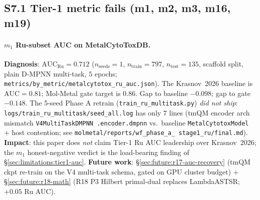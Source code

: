 \subsection*{S7.1 Tier-1 metric fails (m1, m2, m3, m16, m19)}
\label{supp:s7-tier1-fails}

\paragraph{$m_1$ Ru-subset AUC on MetalCytoToxDB.}
\textbf{Diagnosis}: \MEASURED{}
$\mathrm{AUC}_{\mathrm{Ru}}{=}0.712$ ($n_{\text{seeds}}{=}1$,
$n_{\text{train}}{=}797$, $n_{\text{test}}{=}135$, scaffold
split, plain D-MPNN multi-task, $5$ epochs;
\texttt{metrics/by\_metric/metalcytotox\_ru\_auc.json}).
The Krasnov~2026 baseline is $\mathrm{AUC}{=}0.81$;
Mol-Metal gate target is $0.86$.  Gap to baseline $-0.098$;
gap to gate $-0.148$.  The 5-seed Phase A retrain
(\texttt{train\_ru\_multitask.py}) \emph{did not ship}:
\texttt{logs/train\_ru\_multitask/seed\_all.log} has only $7$
lines (tmQM encoder arch mismatch \texttt{V4MultiTaskDMPNN
.encoder.dmpnn} vs.\ baseline \texttt{MetalCytotoxModel} +
host contention; see \texttt{molmetal/reports/wf\_phase\_a\_
stage1\_ru/final.md}).
\textbf{Impact}: this paper does \emph{not} claim Tier-1 Ru AUC
leadership over Krasnov~2026; the $m_1$ honest-negative verdict
is the load-bearing finding of \S\ref{sec:limitations:tier1-auc}.
\textbf{Future work}:
\S\ref{sec:future:r17-auc-recovery} (tmQM ckpt re-train on the
V4 multi-task schema, gated on GPU cluster budget) +
\S\ref{sec:future:r18-math} (R18 P3 Hilbert primal-dual
replaces LambdaASTSR; \PROJECTED{} $+0.05$ Ru AUC).

